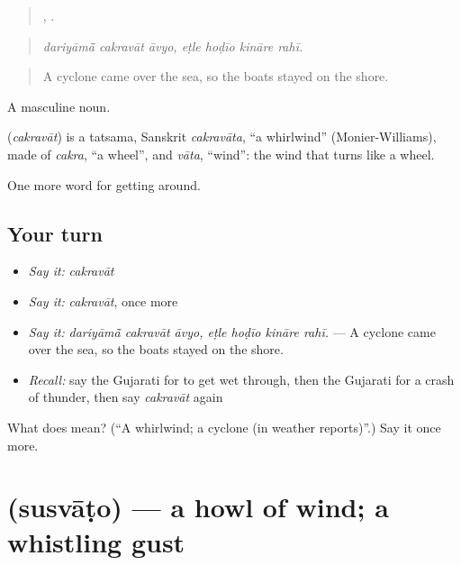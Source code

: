 \begin{quote}
  ,    .
\end{quote}

\begin{quote}
\emph{dariyāmā̃ cakravāt āvyo, eṭle hoḍīo kināre rahī.}
\end{quote}

\begin{quote}
A cyclone came over the sea, so the boats stayed on the shore.
\end{quote}

A masculine noun.

\begin{cousinweb}
\textbf{} (\emph{cakravāt}) is a tatsama, Sanskrit \emph{cakravāta}, \textquotedblleft{}a whirlwind\textquotedblright{} (Monier-Williams), made of \emph{cakra}, \textquotedblleft{}a wheel\textquotedblright{}, and \emph{vāta}, \textquotedblleft{}wind\textquotedblright{}: the wind that turns like a wheel.
\end{cousinweb}

\begin{grammarlens}[title={What you've built}]
One more word for getting around.
\end{grammarlens}

\subsection*{Your turn}
\begin{itemize}
\raggedright
  \item \emph{Say it:} \emph{cakravāt}
  \item \emph{Say it:} \emph{cakravāt}, once more
  \item \emph{Say it:} \emph{dariyāmā̃ cakravāt āvyo, eṭle hoḍīo kināre rahī.} — A cyclone came over the sea, so the boats stayed on the shore.
  \item \emph{Recall:} say the Gujarati for to get wet through, then the Gujarati for a crash of thunder, then say \emph{cakravāt} again
\end{itemize}

\begin{tcolorbox}[breakable,colback=teal!4,colframe=teal!35!black,title={Before you move on}]
What does  mean? (\textquotedblleft{}A whirlwind; a cyclone (in weather reports)\textquotedblright{}.) Say it once more.
\end{tcolorbox}
\section[\texorpdfstring{\gu{સુસવાટો} (susvāṭo)}{સુસવાટો (susvāṭo)}]{ (susvāṭo) — a howl of wind; a whistling gust}

